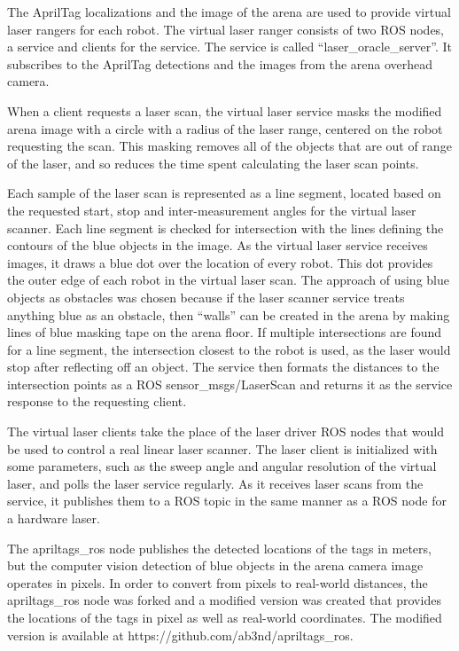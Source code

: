 The AprilTag localizations and the image of the arena are used to provide virtual laser rangers for each robot. 
The virtual laser ranger consists of two ROS nodes, a service and clients for the service. 
The service is called ``laser\_oracle\_server''. 
It subscribes to the AprilTag detections and the images from the arena overhead camera. 
 
When a client requests a laser scan, the virtual laser service masks the modified arena image with a circle with a radius of the laser range, centered on the robot requesting the scan.
This masking removes all of the objects that are out of range of the laser, and so reduces the time spent calculating the laser scan points. 

Each sample of the laser scan is represented as a line segment, located based on the requested start, stop and inter-measurement angles for the virtual laser scanner. 
Each line segment is checked for intersection with the lines defining the contours of the blue objects in the image. 
As the virtual laser service receives images, it draws a blue dot over the location of every robot. 
This dot provides the outer edge of each robot in the virtual laser scan. 
The approach of using blue objects as obstacles was chosen because if the laser scanner service treats anything blue as an obstacle, then ``walls'' can be created in the arena by making lines of blue masking tape on the arena floor. 
If multiple intersections are found for a line segment, the intersection closest to the robot is used, as the laser would stop after reflecting off an object.
The service then formats the distances to the intersection points as a ROS sensor\_msgs/LaserScan and returns it as the service response to the requesting client. 

The virtual laser clients take the place of the laser driver ROS nodes that would be used to control a real linear laser scanner. 
The laser client is initialized with some parameters, such as the sweep angle and angular resolution of the virtual laser, and polls the laser service regularly. 
As it receives laser scans from the service, it publishes them to a ROS topic in the same manner as a ROS node for a hardware laser. 

The apriltags\_ros node publishes the detected locations of the tags in meters, but the computer vision detection of blue objects in the arena camera image operates in pixels. 
In order to convert from pixels to real-world distances, the apriltags\_ros node was forked and a modified version was created that provides the locations of the tags in pixel as well as real-world coordinates. 
The modified version is available at https://github.com/ab3nd/apriltags\_ros.

